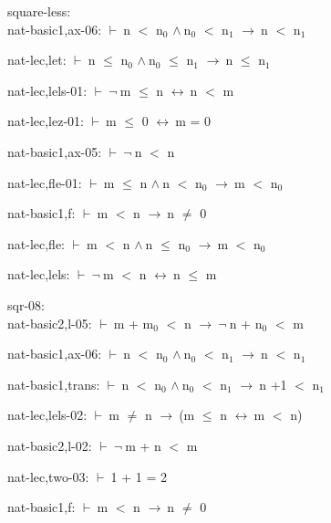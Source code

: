 \documentclass[a4paper]{article}
\newcommand{\Fol}{\mbox{$\vdash\ $}}
\newcommand{\Not}{\mbox{$\neg\ $}}
\newcommand{\And}{\mbox{$\wedge\ $}}
\newcommand{\Imp}{\mbox{$\rightarrow\ $}}
\newcommand{\Equiv}{\mbox{$\leftrightarrow\ $}}
\begin{document}
\bigskip

square-less:\\ nat-basic1,ax-06: 
 \Fol n $<$ $\mbox{n}_{0}$ \And $\mbox{n}_{0}$ $<$ $\mbox{n}_{1}$ \Imp n $<$ $\mbox{n}_{1}$



nat-lec,let: 
 \Fol n $\le$ $\mbox{n}_{0}$ \And $\mbox{n}_{0}$ $\le$ $\mbox{n}_{1}$ \Imp n $\le$ $\mbox{n}_{1}$

nat-lec,lels-01: 
 \Fol \Not m $\le$ n \Equiv n $<$ m



nat-lec,lez-01: 
 \Fol m $\le$ 0 \Equiv m = 0



nat-basic1,ax-05: 
 \Fol \Not n $<$ n



nat-lec,fle-01: 
 \Fol m $\le$ n \And n $<$ $\mbox{n}_{0}$ \Imp m $<$ $\mbox{n}_{0}$



nat-basic1,f: 
 \Fol m $<$ n \Imp n $\neq$ 0



nat-lec,fle: 
 \Fol m $<$ n \And n $\le$ $\mbox{n}_{0}$ \Imp m $<$ $\mbox{n}_{0}$



nat-lec,lels: 
 \Fol \Not m $<$ n \Equiv n $\le$ m



\bigskip

sqr-08:\\ nat-basic2,l-05: 
 \Fol m + $\mbox{m}_{0}$ $<$ n \Imp \Not n + $\mbox{n}_{0}$ $<$ m



nat-basic1,ax-06: 
 \Fol n $<$ $\mbox{n}_{0}$ \And $\mbox{n}_{0}$ $<$ $\mbox{n}_{1}$ \Imp n $<$ $\mbox{n}_{1}$



nat-basic1,trans: 
 \Fol n $<$ $\mbox{n}_{0}$ \And $\mbox{n}_{0}$ $<$ $\mbox{n}_{1}$ \Imp n +1 $<$ $\mbox{n}_{1}$



nat-lec,lels-02: 
 \Fol m $\neq$ n \Imp (m $\le$ n \Equiv m $<$ n)



nat-basic2,l-02: 
 \Fol \Not m + n $<$ m



nat-lec,two-03: 
 \Fol 1 + 1 = 2



nat-basic1,f: 
 \Fol m $<$ n \Imp n $\neq$ 0
\end{document}
